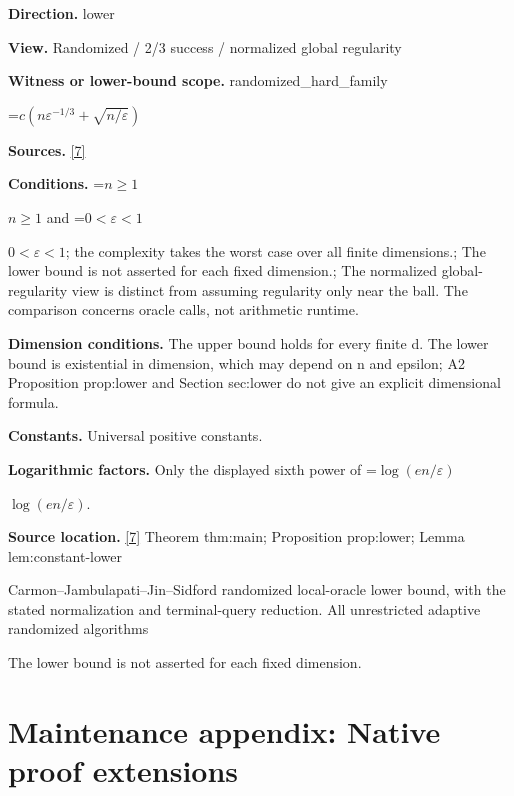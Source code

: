 \documentclass[10pt,a4paper]{article}
\newcommand{\AtlasMath}[1]{\par\begingroup\centering\setbox0=\hbox{$\displaystyle #1$}\ifdim\wd0>1.4\linewidth\typeout{ATLAS WIDE FORMULA: \the\wd0}\fi\ifdim\wd0>\linewidth\resizebox{\linewidth}{!}{\box0}\else\box0\fi\par\endgroup}
\newcommand{\AtlasInlineMath}[1]{\begingroup\setbox0=\hbox{$#1$}\ifdim\wd0>.4\linewidth\endgroup\AtlasMath{#1}\else\endgroup$#1$\fi}
\begin{document}
\textbf{Direction.} lower



\textbf{View.} Randomized / 2/3 success / normalized global regularity



\textbf{Witness or lower-bound scope.} randomized\_hard\_family



\AtlasMath{c(n\varepsilon^{-1/3}+\sqrt{n/\varepsilon})}


\textbf{Sources.} \href{https://github.com/WU-Wendao/Colombo/blob/main/colombo_sensorium/Complexity_altas/data/sources/colombo/A2/manuscript.pdf}{[7]}



\textbf{Conditions.} \AtlasInlineMath{n\ge1} and \AtlasInlineMath{0<\varepsilon<1}; the complexity takes the worst case over all finite dimensions.; The lower bound is not asserted for each fixed dimension.; The normalized global-regularity view is distinct from assuming regularity only near the ball. The comparison concerns oracle calls, not arithmetic runtime.



\textbf{Dimension conditions.} The upper bound holds for every finite d. The lower bound is existential in dimension, which may depend on n and epsilon; A2 Proposition prop:lower and Section sec:lower do not give an explicit dimensional formula.



\textbf{Constants.} Universal positive constants.



\textbf{Logarithmic factors.} Only the displayed sixth power of \AtlasInlineMath{\log(en/\varepsilon)}.



\textbf{Source location.} \href{https://github.com/WU-Wendao/Colombo/blob/main/colombo_sensorium/Complexity_altas/data/sources/colombo/A2/manuscript.pdf}{[7]} Theorem thm:main; Proposition prop:lower; Lemma lem:constant-lower



Carmon--Jambulapati--Jin--Sidford randomized local-oracle lower bound, with the stated normalization and terminal-query reduction. All unrestricted adaptive randomized algorithms



The lower bound is not asserted for each fixed dimension.



\section{Maintenance appendix: Native proof extensions}
\end{document}
